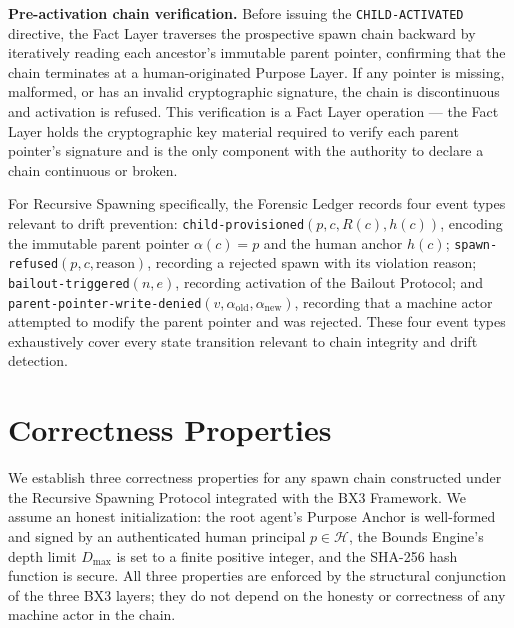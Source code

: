 \textbf{Pre-activation chain verification.} Before issuing the \texttt{CHILD-ACTIVATED} directive, the Fact Layer traverses the prospective spawn chain backward by iteratively reading each ancestor's immutable parent pointer, confirming that the chain terminates at a human-originated Purpose Layer. If any pointer is missing, malformed, or has an invalid cryptographic signature, the chain is discontinuous and activation is refused. This verification is a Fact Layer operation --- the Fact Layer holds the cryptographic key material required to verify each parent pointer's signature and is the only component with the authority to declare a chain continuous or broken.

For Recursive Spawning specifically, the Forensic Ledger records four event types relevant to drift prevention: \texttt{child-provisioned}$(p, c, R(c), h(c))$, encoding the immutable parent pointer $\alpha(c) = p$ and the human anchor $h(c)$; \texttt{spawn-refused}$(p, c, \text{reason})$, recording a rejected spawn with its violation reason; \texttt{bailout-triggered}$(n, e)$, recording activation of the Bailout Protocol; and \texttt{parent-pointer-write-denied}$(v, \alpha_{\text{old}}, \alpha_{\text{new}})$, recording that a machine actor attempted to modify the parent pointer and was rejected. These four event types exhaustively cover every state transition relevant to chain integrity and drift detection.


\section{Correctness Properties}
\label{sec:correctness-properties}

We establish three correctness properties for any spawn chain constructed under the Recursive Spawning Protocol integrated with the BX3 Framework. We assume an honest initialization: the root agent's Purpose Anchor is well-formed and signed by an authenticated human principal $p \in \mathcal{H}$, the Bounds Engine's depth limit $D_{\max}$ is set to a finite positive integer, and the SHA-256 hash function is secure. All three properties are enforced by the structural conjunction of the three BX3 layers; they do not depend on the honesty or correctness of any machine actor in the chain.

